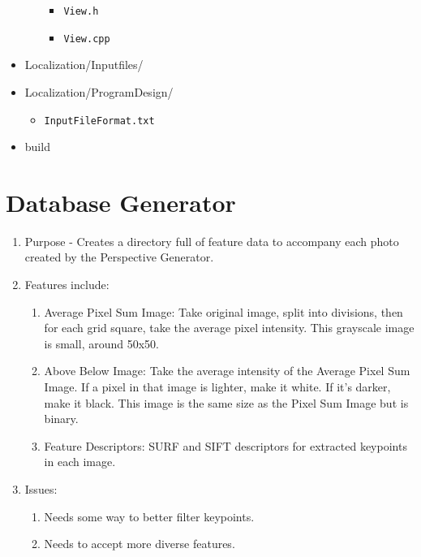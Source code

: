 \documentclass[a4paper,11pt]{article}
\begin{document}
\begin{itemize}
\begin{itemize}
\begin{itemize}
                    \item \texttt{View.h}
                    \item \texttt{View.cpp}
                \end{itemize}
            \end{itemize}%
        \item Localization/Inputfiles/
        \item Localization/ProgramDesign/
            \begin{itemize}
                \item \texttt{InputFileFormat.txt}
            \end{itemize}
        \item build
        \end{itemize} %

        



\section{Database Generator}
\begin{enumerate}
    \item Purpose - Creates a directory full of feature data to accompany each photo created by the Perspective Generator. 
    \item Features include:
    \begin{enumerate}
        \item Average Pixel Sum Image: Take original image, split into divisions, then for each grid square, take the average pixel intensity. This grayscale image is small, around 50x50.
        \item Above Below Image: Take the average intensity of the Average Pixel Sum Image. If a pixel in that image is lighter, make it white. If it's darker, make it black. This image is the same size as the Pixel Sum Image but is binary.
        \item Feature Descriptors: SURF and SIFT descriptors for extracted keypoints in each image.
    \end{enumerate}
    \item Issues:
    \begin{enumerate}
        \item Needs some way to better filter keypoints.
        \item Needs to accept more diverse features.
    \end{enumerate}
\end{enumerate}

  

  
\end{document}

